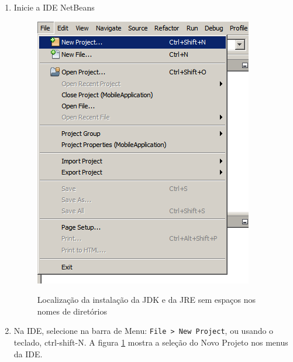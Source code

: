 \documentclass[
	12pt,				%
	twoside,			%
	a4paper,			%
	english,			%
	french,				%
	spanish,			%
	brazil				%
	]{abntex2}
\begin{document}
\begin{enumerate}
\item Inicie a IDE NetBeans

\begin{figure}[h]
\begin{center}
\includegraphics[scale=0.3]{new-proj.png} 
\caption{Localização da instalação da JDK e da JRE sem espaços nos nomes de diretórios}
\label{fig:newProj}
\end{center}
\end{figure}

\item Na IDE, selecione na barra de Menu: \texttt{File > New Project}, ou usando o teclado, ctrl-shift-N. A figura \ref{fig:newProj} mostra a seleção do Novo Projeto nos menus da IDE.


\end{enumerate}
\end{document}

